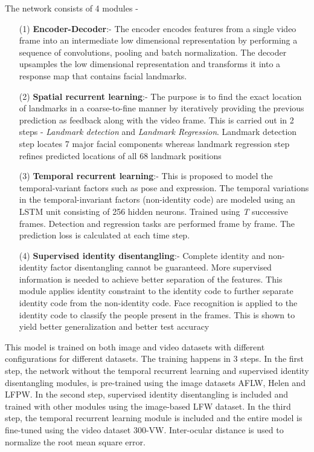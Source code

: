 \documentclass{llncs}
\begin{document}
The network consists of 4 modules -
\begin{itemize}
\item[(1)] \textbf{Encoder-Decoder}:-
The encoder encodes features from a single video frame into an intermediate low dimensional representation by performing a sequence of convolutions, pooling and batch normalization. The decoder upsamples the low dimensional representation and transforms it into a response map that contains facial landmarks.\\


\item[(2)] \textbf{Spatial recurrent learning}:-
The purpose is to find the exact location of landmarks in a coarse-to-fine manner by iteratively providing the previous prediction as feedback along with the video frame. This is carried out in 2 steps - \textit{Landmark detection} and \textit{Landmark Regression}. Landmark detection step locates 7 major facial components whereas landmark regression step refines predicted locations of all 68 landmark positions\\

\item[(3)] \textbf{Temporal recurrent learning}:-
This is proposed to model the temporal-variant factors such as pose and expression. The temporal variations in the temporal-invariant factors (non-identity code) are modeled using an LSTM unit consisting of 256 hidden neurons.
Trained using \textit{T} successive frames. Detection and regression tasks are performed frame by frame. The prediction loss is calculated at each time step. 
\\

\item[(4)] \textbf{Supervised identity disentangling}:-
Complete identity and non-identity factor disentangling cannot be guaranteed. More supervised information is needed to achieve better separation of the features. This module applies identity constraint to the identity code to further separate identity code from the non-identity code. Face recognition is applied to the identity code to classify the people present in the frames. This is shown to yield better generalization and better test accuracy\\
\end{itemize}

This model is trained on both image and video datasets with different configurations for different datasets. The training happens in 3 steps. In the first step, the network without the temporal recurrent learning and supervised identity disentangling modules, is pre-trained using the image datasets AFLW, Helen and LFPW. In the second step, supervised identity disentangling is included and trained with other modules using the image-based LFW dataset. In the third step, the temporal recurrent learning module is included and the entire model is fine-tuned using the video dataset 300-VW. Inter-ocular distance is used to normalize the root mean square error. 
\end{document}

